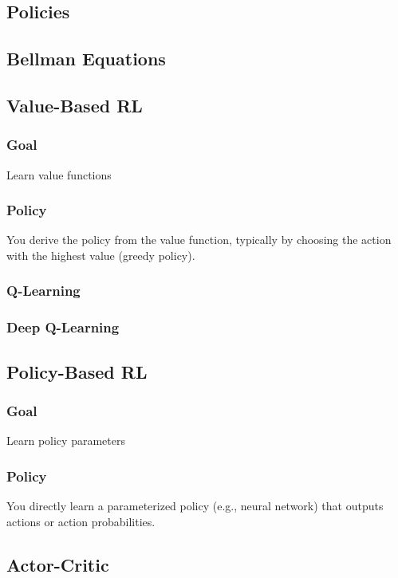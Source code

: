 \documentclass{article}
\begin{document}
\subsection{Policies}

\subsection{Bellman Equations}

\subsection{Value-Based RL}

\subsubsection{Goal} Learn value functions

\subsubsection{Policy} You derive the policy from the value function, typically by choosing the action with the highest value (greedy policy).

\subsubsection{Q-Learning}

\subsubsection{Deep Q-Learning}

\subsection{Policy-Based RL}

\subsubsection{Goal} Learn policy parameters

\subsubsection{Policy} You directly learn a parameterized policy (e.g., neural network) that outputs actions or action probabilities.

\subsection{Actor-Critic}
\end{document}
